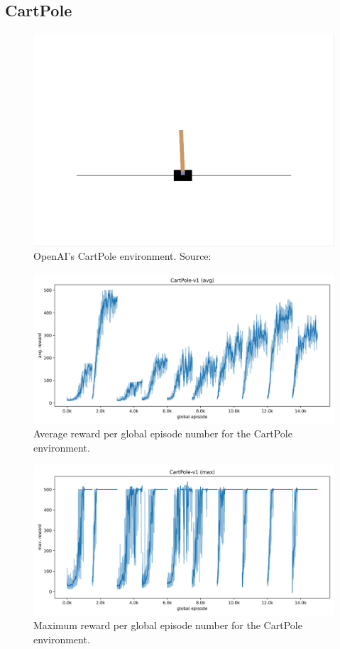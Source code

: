\documentclass{article}
\begin{document}
\subsection{CartPole}
\label{ssec:cp}
\begin{figure}[htbp]
    \centering
    \includegraphics[width=0.9\linewidth]{figs/cartpole.png}
    \caption{
        OpenAI's CartPole environment. 
        Source: \cite{gymlibraryCartPole}
    }
    \label{fig:cartpole}
\end{figure}

\begin{figure}[htbp]
    \centering
    \includegraphics[width=0.9\linewidth]{figs/cp_avg_rewards.png}
    \caption{
        Average reward per global episode number for the CartPole environment.
    }
    \label{fig:avg-cp}
\end{figure}

\begin{figure}[htbp]
    \centering
    \includegraphics[width=0.9\linewidth]{figs/cp_max_rewards.png}
    \caption{
        Maximum reward per global episode number for the CartPole environment.
    }
    \label{fig:max-cp}
\end{figure}
\end{document}
